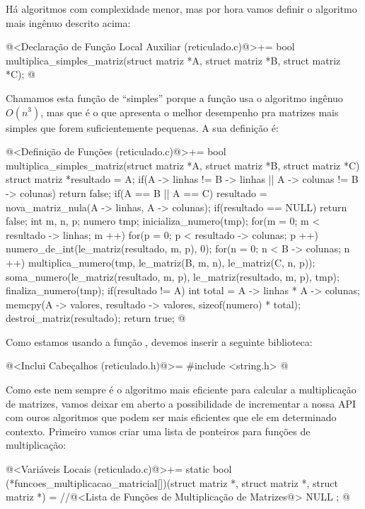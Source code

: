 Há algoritmos com complexidade menor, mas por hora vamos definir o
algoritmo mais ingênuo descrito acima:

\iniciocodigo
@<Declaração de Função Local Auxiliar (reticulado.c)@>+=
bool multiplica_simples_matriz(struct matriz *A, struct matriz *B,
                               struct matriz *C);
@
\fimcodigo

Chamamos esta função de ``simples'' porque a função usa o algoritmo
ingênuo $O(n^3)$, mas que é o que apresenta o melhor desempenho pra
matrizes mais simples que forem suficientemente pequenas. A sua
definição é:

\iniciocodigo
@<Definição de Funções (reticulado.c)@>+=
bool multiplica_simples_matriz(struct matriz *A, struct matriz *B,
                               struct matriz *C){
  struct matriz *resultado = A;
  if(A -> linhas != B -> linhas || A -> colunas != B -> colunas)
    return false;
  if(A == B || A == C){
    resultado = nova_matriz_nula(A -> linhas, A -> colunas);
    if(resultado == NULL)
      return false;
  }
  {
    int m, n, p;
    numero tmp;
    inicializa_numero(tmp);
    for(m = 0; m < resultado -> linhas; m ++)
      for(p = 0; p < resultado -> colunas; p ++){
        numero_de_int(le_matriz(resultado, m, p), 0);
        for(n = 0; n < B -> colunas; n ++){
          multiplica_numero(tmp, le_matriz(B, m, n), le_matriz(C, n, p));
          soma_numero(le_matriz(resultado, m, p),
                      le_matriz(resultado, m, p), tmp);
        }
      }
    finaliza_numero(tmp);
  }
  if(resultado != A){
    int total = A -> linhas * A -> colunas;
    memcpy(A -> valores, resultado -> valores, sizeof(numero) * total);
    destroi_matriz(resultado);
  }
  return true;
}
@
\fimcodigo

Como estamos usando a função , devemos inserir a
seguinte biblioteca:

\iniciocodigo
@<Inclui Cabeçalhos (reticulado.h)@>=
#include <string.h>
@
\fimcodigo

Como este nem sempre é o algoritmo mais eficiente para calcular a
multiplicação de matrizes, vamos deixar em aberto a possibilidade de
incrementar a nossa API com ouros algoritmos que podem ser mais
eficientes que ele em determinado contexto. Primeiro vamos criar uma
lista de ponteiros para funções de multiplicação:

\iniciocodigo
@<Variáveis Locais (reticulado.c)@>+=
static bool (*funcoes_multiplicacao_matricial[])(struct matriz *,
                                                struct matriz *,
                                                struct matriz *) =
  {
    //@<Lista de Funções de Multiplicação de Matrizes@>
    NULL
  };
@
\fimcodigo

